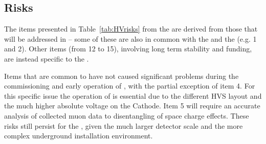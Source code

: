 \subsection{Risks}
\label{sec:fddp-hv-org-risk}

The items presented in %
Table~\ref{tab:HVrisks} from the  are derived from those that will be addressed in  %
  -- some of these are also in common with the  and the  (e.g. 1 and 2). Other  %
items (from 12 to 15), involving long term stability and funding, are instead specific to the  %
. 

Items that are common to   have not caused significant problems during the commissioning and early operation of , with the partial exception of  %
item 4. For this specific issue the operation of  is essential due to the different HVS layout and the much higher absolute voltage on the Cathode. 
Item 5 will require an accurate analysis of collected muon data  %
to disentangling of space charge effects. 
These risks still persist for the , %
given the much larger detector scale and the more complex underground installation environment.


